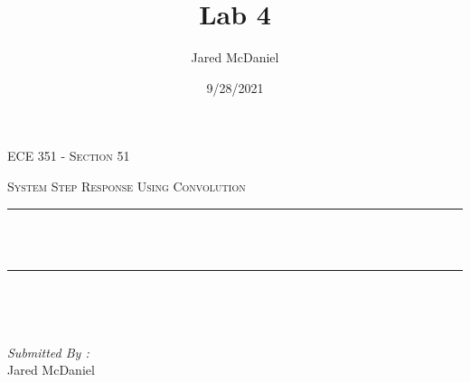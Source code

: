 \documentclass[12pt]{report}
\title{Lab 4}
\author{ Jared McDaniel}
\date{9/28/2021}
\makeatletter
\let\thetitle\@title
\makeatother
\begin{document}

\begin{titlepage}
	\centering
    \vspace*{0.5 cm}
\begin{center}    \textsc{\Large   ECE 351 - Section 51 }\\[2.0 cm]	\end{center}%
	\textsc{\Large System Step Response Using Convolution  }\\[0.5 cm]				%
	\rule{\linewidth}{0.2 mm} \\[0.4 cm]
	{ \huge \bfseries \thetitle}\\
	\rule{\linewidth}{0.2 mm} \\[1.5 cm]
	
	\begin{minipage}{0.4\textwidth}
		\begin{flushleft} \large
			\end{flushleft}
			\end{minipage}~
			\begin{minipage}{0.4\textwidth}
            
			\begin{flushright} \large
			\emph{Submitted By :} \\
			Jared McDaniel  
		\end{flushright}
           
	\end{minipage}\\[2 cm]
	
    
    
    
    
	
\end{titlepage}


\tableofcontents
\pagebreak

\renewcommand{\thesection}{\arabic{section}}
\end{document}
